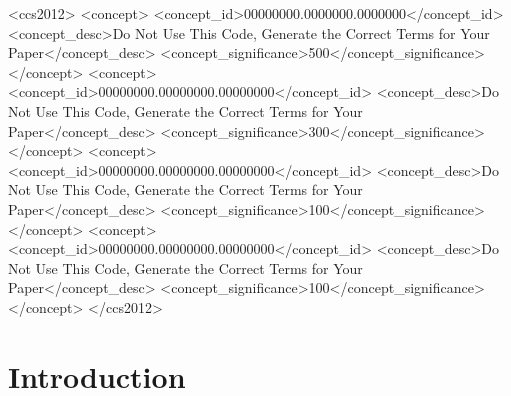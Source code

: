 \documentclass[manuscript,screen,review,format=acmsmall]{acmart}
\begin{document}
\begin{CCSXML}
<ccs2012>
 <concept>
  <concept_id>00000000.0000000.0000000</concept_id>
  <concept_desc>Do Not Use This Code, Generate the Correct Terms for Your Paper</concept_desc>
  <concept_significance>500</concept_significance>
 </concept>
 <concept>
  <concept_id>00000000.00000000.00000000</concept_id>
  <concept_desc>Do Not Use This Code, Generate the Correct Terms for Your Paper</concept_desc>
  <concept_significance>300</concept_significance>
 </concept>
 <concept>
  <concept_id>00000000.00000000.00000000</concept_id>
  <concept_desc>Do Not Use This Code, Generate the Correct Terms for Your Paper</concept_desc>
  <concept_significance>100</concept_significance>
 </concept>
 <concept>
  <concept_id>00000000.00000000.00000000</concept_id>
  <concept_desc>Do Not Use This Code, Generate the Correct Terms for Your Paper</concept_desc>
  <concept_significance>100</concept_significance>
 </concept>
</ccs2012>
\end{CCSXML}




\maketitle

\section{Introduction}
\end{document}
